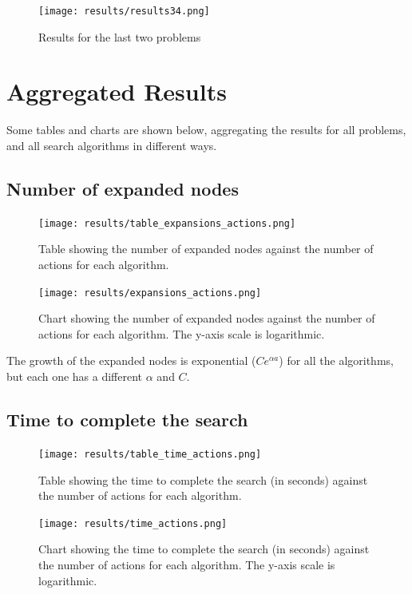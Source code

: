 \documentclass[a4paper,12pt]{article}
\begin{document}
\begin{figure}[!h]
\centering
\texttt{[image: results/results34.png]}
\caption{Results for the last two problems}
\label{fig_raw_data}
\end{figure}

\newpage
\section{Aggregated Results}
Some tables and charts are shown below, aggregating the results for all problems, and all search algorithms in different ways.

\subsection{Number of expanded nodes}
\begin{figure}[!h]
\centering
\texttt{[image: results/table\_expansions\_actions.png]}
\caption{Table showing the number of expanded nodes against the number of actions for each algorithm.}
\label{fig_raw_data}
\end{figure}

\begin{figure}[!h]
\centering
\texttt{[image: results/expansions\_actions.png]}
\caption{Chart showing the number of expanded nodes against the number of actions for each algorithm. The y-axis scale is logarithmic.}
\label{fig_raw_data}
\end{figure}

The growth of the expanded nodes is exponential ($C e^{\alpha a}$) for all the algorithms, but each one has a different $\alpha$ and $C$.

\newpage
\subsection{Time to complete the search}
\begin{figure}[!h]
\centering
\texttt{[image: results/table\_time\_actions.png]}
\caption{Table showing the time to complete the search (in seconds) against the number of actions for each algorithm.}
\label{fig_raw_data}
\end{figure}

\begin{figure}[!h]
\centering
\texttt{[image: results/time\_actions.png]}
\caption{Chart showing the time to complete the search (in seconds) against the number of actions for each algorithm. The y-axis scale is logarithmic.}
\label{fig_raw_data}
\end{figure}
\end{document}
